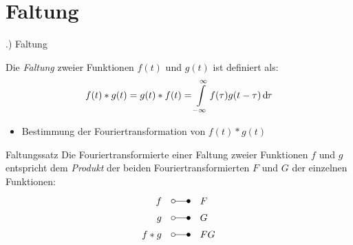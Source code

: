 \documentclass[t,14pt]{beamer}
\newcommand*\diff{\mathop{}\!\mathrm{d\hspace{-1pt}}}	%
\begin{document}
\section{Faltung}
\begin{frame}{\thesection .) Faltung}
    \begin{definition}
        Die \emph{Faltung} zweier Funktionen $f(t)$ und $g(t)$ ist definiert als:
        \[
        f(t)*g(t) = g(t)*f(t) = \intl_{-\infty}^{\infty} f(\tau)g(t-\tau)\diff \tau
        \]
    \end{definition}
    \begin{itemize}
        \item Bestimmung der Fouriertransformation von $f(t)*g(t)$
        \begin{center}
        \end{center}
    \end{itemize}
    \begin{alertblock}{Faltungssatz}
        Die Fouriertransformierte einer Faltung zweier Funktionen $f$ und $g$ entspricht dem \emph{Produkt} der beiden Fouriertransformierten
        $F$ und $G$ der einzelnen Funktionen:
        \begin{align*}
            f\quad   &\laplace\quad F\\
            g\quad   &\laplace\quad G\\
            f*g\quad &\laplace\quad FG
        \end{align*}
    \end{alertblock}
\end{frame}
\end{document}
